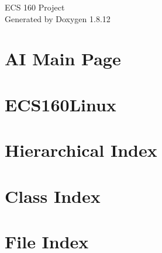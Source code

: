 \documentclass[twoside]{book}
\newcommand{\+}{\discretionary{\mbox{\scriptsize$\hookleftarrow$}}{}{}}
\newcommand{\clearemptydoublepage}{%
  \newpage{\pagestyle{empty}\cleardoublepage}%
}
\begin{document}
\hypersetup{pageanchor=false,
             bookmarksnumbered=true,
             pdfencoding=unicode
            }
\begin{titlepage}
\vspace*{7cm}
\begin{center}%
{\Large E\+CS 160 Project }\\
\vspace*{1cm}
{\large Generated by Doxygen 1.8.12}\\
\end{center}
\end{titlepage}
\clearemptydoublepage
{}
\tableofcontents
\clearemptydoublepage
{}
\hypersetup{pageanchor=true}

\chapter{AI Main Page}
\label{index}\hypertarget{index}{}
\chapter{E\+C\+S160\+Linux}
\label{md_README}
\hypertarget{md_README}{}

\chapter{Hierarchical Index}

\chapter{Class Index}

\chapter{File Index}

\end{document}
